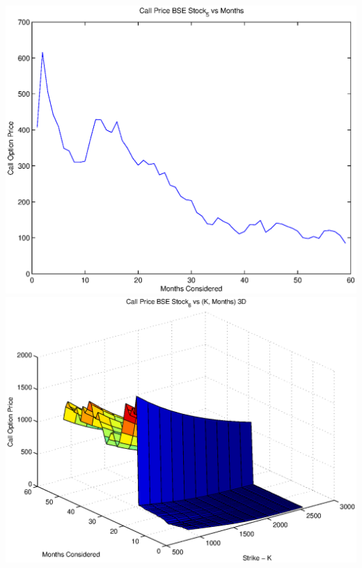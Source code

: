 \documentclass{article}
\begin{document}
\includegraphics[width=\textwidth]{Call_Price_BSE_Stock_5_vs_Months} \\

\includegraphics[width=\textwidth]{Call_Price_BSE_Stock_6_vs_(K,_Months)_3D} \\
\end{document}
